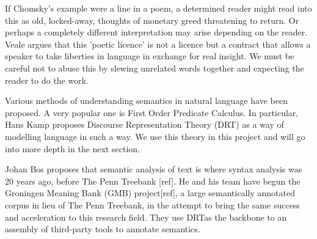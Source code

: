 If Chomsky's example were a line in a poem, a determined reader might read into this as old, locked-away, thoughts of monetary greed threatening to return. Or perhaps a completely different interpretation may arise depending on the reader.  Veale argues that this 'poetic licence' is not a licence but a contract that allows a speaker to take liberties in language in exchange for real insight. We must be careful not to abuse this by slewing unrelated words together and expecting the reader to do the work.

Various methods of understanding semantics in natural language have been proposed. A very popular one is First Order Predicate Calculus. In particular, Hans Kamp proposes Discourse Representation Theory (DRT) as a way of modelling language in such a way. We use this theory in this project and will go into more depth in the next section.

Johan Bos proposes that semantic analysis of text is where syntax analysis was 20 years ago, before The Penn Treebank [ref]. He and his team have begun the Groningen Meaning Bank (GMB) project[ref], a large semantically annotated corpus in lieu of The Penn Treebank, in the attempt to bring the same success and acceleration to this research field. They use DRTas the backbone to an assembly of third-party tools to annotate semantics.

